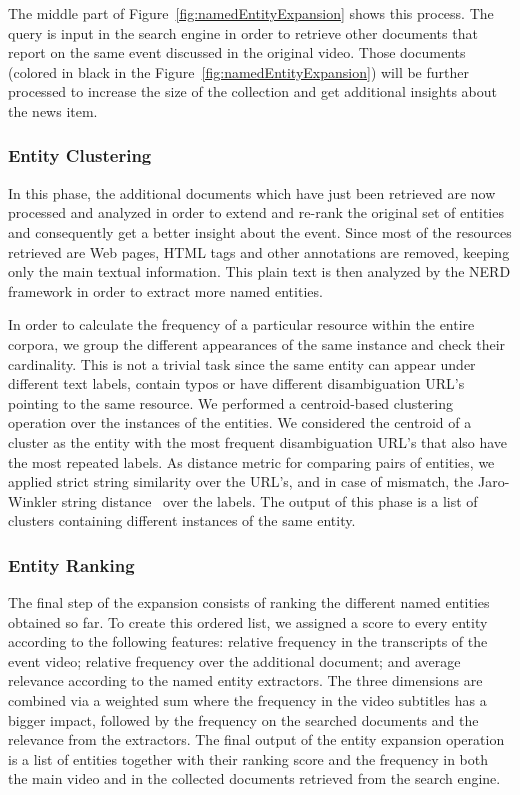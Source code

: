 \documentclass{llncs}
\begin{document}
The middle part of Figure~\ref{fig:namedEntityExpansion} shows this process. The query is input in the search engine in order to retrieve other documents that report on the same event discussed in the original video. Those documents (colored in black in the Figure~\ref{fig:namedEntityExpansion}) will be further processed to increase the size of the collection and get additional insights about the news item.

\subsubsection{Entity Clustering}
In this phase, the additional documents which have just been retrieved are now processed and analyzed in order to extend and re-rank the original set of entities and consequently get a better insight about the event. Since most of the resources retrieved are Web pages, HTML tags and other annotations are removed, keeping only the main textual information. This plain text is then analyzed by the NERD framework in order to extract more named entities.

In order to calculate the frequency of a particular resource within the entire corpora, we group the different appearances of the same instance and check their cardinality. This is not a trivial task since the same entity can appear under different text labels, contain typos or have different disambiguation URL's pointing to the same resource. We performed a centroid-based clustering operation over the instances of the entities. We considered the centroid of a cluster as the entity with the most frequent disambiguation URL's that also have the most repeated labels. As distance metric for comparing pairs of entities, we applied strict string similarity over the URL's, and in case of mismatch, the Jaro-Winkler string distance~\cite{winkler2006overview} over the labels. The output of this phase is a list of clusters containing different instances of the same entity.

\subsubsection{Entity Ranking}
The final step of the expansion consists of ranking the different named entities obtained so far. To create this ordered list, we assigned a score to every entity according to the following features: relative frequency in the transcripts of the event video; relative frequency over the additional document; and average relevance according to the named entity extractors. The three dimensions are combined via a weighted sum where the frequency in the video subtitles has a bigger impact, followed by the frequency on the searched documents and the relevance from the extractors. The final output of the entity expansion operation is a list of entities together with their ranking score and the frequency in both the main video and in the collected documents retrieved from the search engine.
\end{document}
